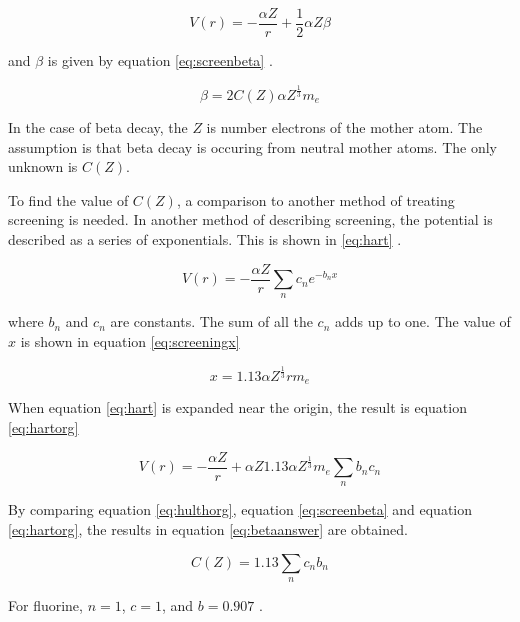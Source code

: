 {\begin{equation}
	V(r) = -\frac{\alpha Z}{r} + \frac{1}{2}\alpha Z \beta
	\label{eq:hulthorg}
\end{equation}

and $\beta$ is given by equation \ref{eq:screenbeta} \cite{Buh84}. 
	
\begin{equation}
	\beta = 2C(Z)\alpha Z^{\frac{1}{3}} m_{e}
	\label{eq:screenbeta}
\end{equation}

In the case of beta decay, the $Z$ is number electrons of the mother atom.
The assumption is that beta decay is occuring from neutral mother atoms.
The only unknown is $C(Z)$.

To find the value of $C(Z)$, a comparison to another method of treating screening is needed.
In another method of describing screening, the potential is described as a series of exponentials.
This is shown in \ref{eq:hart} \cite{Bya56}.

\begin{equation}
	V(r) = -\frac{\alpha Z}{r}\sum_{n}c_{n}e^{-b_{n} x}
	\label{eq:hart}
\end{equation}

where $b_{n}$ and $c_{n}$ are constants.
The sum of all the $c_{n}$ adds up to one.
The value of $x$ is shown in equation \ref{eq:screeningx} \cite{Bya56}

\begin{equation}
	x = 1.13 \alpha Z^{\frac{1}{3}} r m_{e}
	\label{eq:screeningx}
\end{equation}

When equation \ref{eq:hart} is expanded near the origin, the result is equation \ref{eq:hartorg}

\begin{equation}
	V(r) = - \frac{\alpha Z}{r} + \alpha Z 1.13 \alpha Z^{\frac{1}{3}} m_{e} \sum_{n} b_{n} c_{n}
	\label{eq:hartorg}
\end{equation}

By comparing equation \ref{eq:hulthorg}, equation \ref{eq:screenbeta} and equation \ref{eq:hartorg}, the results in equation \ref{eq:betaanswer} are obtained.

\begin{equation}
	C(Z) = 1.13 \sum_{n} c_{n} b_{n}
	\label{eq:betaanswer}
\end{equation} 

For fluorine, $n = 1$, $c = 1$, and $b = 0.907$ \cite{Bya56}.

}
